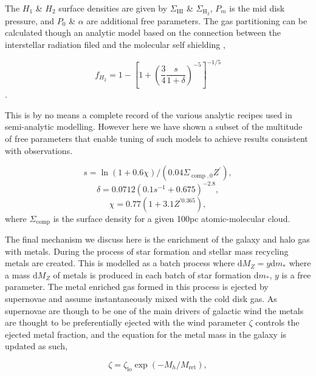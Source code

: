The $H_1$ \& $H_2$ surface densities are given by $\Sigma_{\mathrm{HI}}$ \& $\Sigma_{\mathrm{H}_{2}}$, $P_m$ is the mid disk pressure, and $P_0$ \& $\alpha$ are additional free parameters. The gas partitioning can be calculated though an analytic model based on the connection between the interstellar radiation filed and the molecular self shielding \citep{Krumholz2008TheClouds,Krumholz2009THEDENSITIES,Krumholz2009THEGAS},

\begin{equation}
    f_{H_{2}}=1-\left[1+\left(\frac{3}{4} \frac{s}{1+\delta}\right)^{-5}\right]^{-1 / 5}
\end{equation}.

This is by no means a complete record of the various analytic recipes used in semi-analytic modelling. However here we have shown a subset of the multitude of free parameters that enable tuning of such models to achieve results consistent with observations.

\begin{equation}
s=\ln (1+0.6 \chi) /\left(0.04 \Sigma_{\operatorname{comp}, 0} Z^{\prime}\right),
\end{equation}
\begin{equation}
\delta=0.0712\left(0.1 s^{-1}+0.675\right)^{-2.8},
\end{equation}
\begin{equation}
\chi=0.77\left(1+3.1 Z^{\prime0.365}\right),
\end{equation}
where $\Sigma_{\operatorname{comp}}$ is the surface density for a given 100pc atomic-molecular cloud.

The final mechanism we discuss here is the enrichment of the galaxy and halo gas with metals. During the process of star formation and stellar mass recycling metals are created. This is modelled as a batch process where $\mathrm{d} M_{Z}=y \mathrm{d} m_{*}$ where a mass $\mathrm{d} M_{Z}$ of metals is produced in each batch of star formation $\mathrm{d} m_{*}$, $y$ is a free parameter. The metal enriched gas formed in this process is ejected by supernovae and assume instantaneously mixed with the cold disk gas. As supernovae are though to be one of the main drivers of galactic wind the metals are thought to be preferentially ejected with the wind parameter $\zeta$ controls the ejected metal fraction, and the equation for the metal mass in the galaxy is updated as such,

\begin{equation}
\zeta=\zeta_{\mathrm{lo}} \exp \left(-M_{h} / M_{\mathrm{ret}}\right),
\end{equation}

